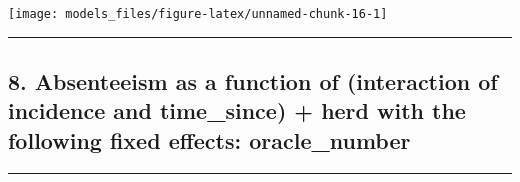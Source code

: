 \documentclass[]{article}
\begin{document}
\begin{center}\texttt{[image: models\_files/figure-latex/unnamed-chunk-16-1]} \end{center}

\newpage

\begin{center}\rule{0.5\linewidth}{\linethickness}\end{center}

\subsection{8. Absenteeism as a function of (interaction of incidence
and time\_since) + herd with the following fixed effects:
oracle\_number}\label{absenteeism-as-a-function-of-interaction-of-incidence-and-time_since-herd-with-the-following-fixed-effects-oracle_number}

\begin{center}\rule{0.5\linewidth}{\linethickness}\end{center}
\end{document}
